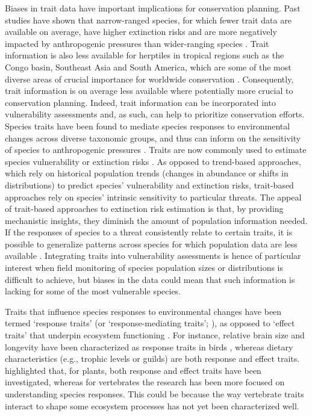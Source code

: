Biases in trait data have important implications for conservation planning. Past studies have shown that narrow-ranged species, for which fewer trait data are available on average, have higher extinction risks \citep{Collen2016, Purvis2000, Ripple2017} and are more negatively impacted by anthropogenic pressures than wider-ranging species \citep{Newbold2018a}. Trait information is also less available for herptiles in tropical regions such as the Congo basin, Southeast Asia and South America, which are some of the most diverse areas of crucial importance for worldwide conservation \citep{Barlow2018}. Consequently, trait information is on average less available where potentially more crucial to conservation planning. Indeed, trait information can be incorporated into vulnerability assessments and, as such, can help to prioritize conservation efforts. Species traits have been found to mediate species responses to environmental changes across diverse taxonomic groups, and thus can inform on the sensitivity of species to anthropogenic pressures \citep{Flynn2009, Newbold2013, Nowakowski2017}. Traits are now commonly used to estimate species vulnerability or extinction risks \citep{Pacifici2015, RamirezBautista2020}. As opposed to trend-based approaches, which rely on historical population trends (changes in abundance or shifts in distributions) to predict species’ vulnerability and extinction risks, trait-based approaches rely on species’ intrinsic sensitivity to particular threats. The appeal of trait-based approaches to extinction risk estimation is that, by providing mechanistic insights, they diminish the amount of population information needed. If the responses of species to a threat consistently relate to certain traits, it is possible to generalize patterns across species for which population data are less available \citep{Verberk2013}. Integrating traits into vulnerability assessments is hence of particular interest when field monitoring of species population sizes or distributions is difficult to achieve, but biases in the data could mean that such information is lacking for some of the most vulnerable species.


Traits that influence species responses to environmental changes have been termed `response traits' (or `response-mediating traits'; \citet{Luck2012}), as opposed to `effect traits' that underpin ecosystem functioning \citep{Lavorel2002a}. For instance, relative brain size and longevity have been characterized as response traits in birds \citep{Newbold2013, Sayol2020}, whereas dietary characteristics (e.g., trophic levels or guilds) are both response and effect traits. \citet{Hortal2015} highlighted that, for plants, both response and effect traits have been investigated, whereas for vertebrates the research has been more focused on understanding species responses. This could be because the way vertebrate traits interact to shape some ecosystem processes has not yet been characterized well.

